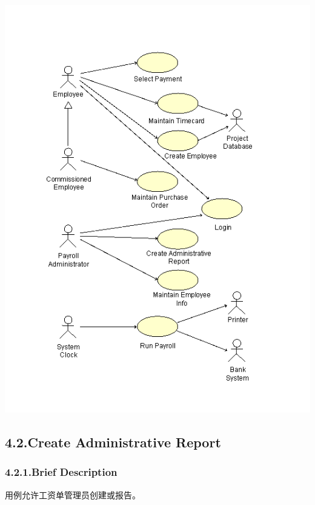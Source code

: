 \documentclass{article}
\begin{document}
\noindent{}\includegraphics[keepaspectratio=true,width=\dimmin{}{\dimwidth{0.90}}]{images/-}{}%

\subsection{4.2.\hspace*{0.5em}Create Administrative Report}\label{sec-create-administrative-report}%

\subsubsection{4.2.1.\hspace*{0.5em}Brief Description}\label{sec-brief-description}%

\noindent{}用例允许工资单管理员创建或报告。%
\end{document}
